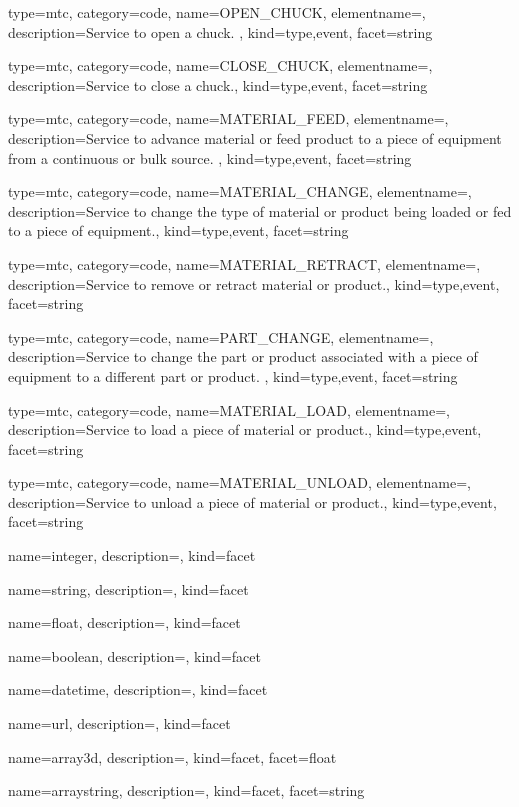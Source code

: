 {
  type=mtc,
  category=code,
  name={OPEN\_CHUCK},
  elementname=,
  description={Service to open a chuck. },
  kind={type,event},
  facet={\gls{string}}
}


{
  type=mtc,
  category=code,
  name={CLOSE\_CHUCK},
  elementname=,
  description={Service to close a chuck.},
  kind={type,event},
  facet={\gls{string}}
}


{
  type=mtc,
  category=code,
  name={MATERIAL\_FEED},
  elementname=,
  description={Service to advance material or feed product to a piece of equipment from a continuous or bulk source. },
  kind={type,event},
  facet={\gls{string}}
}


{
  type=mtc,
  category=code,
  name={MATERIAL\_CHANGE},
  elementname=,
  description={Service to change the type of material or product being loaded or fed to a piece of equipment.},
  kind={type,event},
  facet={\gls{string}}
}


{
  type=mtc,
  category=code,
  name={MATERIAL\_RETRACT},
  elementname=,
  description={Service to remove or retract material or product.},
  kind={type,event},
  facet={\gls{string}}
}


{
  type=mtc,
  category=code,
  name={PART\_CHANGE},
  elementname=,
  description={Service to change the part or product associated with a piece of equipment to a different part or product.  },
  kind={type,event},
  facet={\gls{string}}
}


{
  type=mtc,
  category=code,
  name={MATERIAL\_LOAD},
  elementname=,
  description={Service to load a piece of material or product.},
  kind={type,event},
  facet={\gls{string}}
}


{
  type=mtc,
  category=code,
  name={MATERIAL\_UNLOAD},
  elementname=,
  description={Service to unload a piece of material or product.},
  kind={type,event},
  facet={\gls{string}}
}


{
  name={integer},
  description={},
  kind={facet}
}


{
  name={string},
  description={},
  kind={facet}
}


{
  name={float},
  description={},
  kind={facet}
}


{
  name={boolean},
  description={},
  kind={facet}
}


{
  name={datetime},
  description={},
  kind={facet}
}


{
  name={url},
  description={},
  kind={facet}
}


{
  name={array3d},
  description={},
  kind={facet},
  facet={\gls{float}}
}

{
  name={arraystring},
  description={},
  kind={facet},
  facet={\gls{string}}
}
